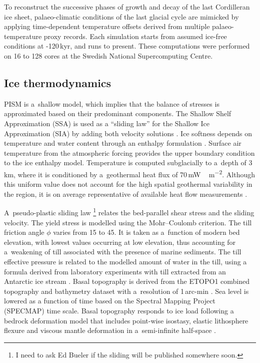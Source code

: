 \documentclass[tc, manuscript]{copernicus}
\begin{document}
To reconstruct the successive phases of growth and decay of the last Cordilleran
ice sheet, palaeo-climatic conditions of the last glacial cycle are mimicked
by applying time-dependent temperature offsets derived from multiple
palaeo-temperature proxy records. Each simulation starts from assumed ice-free
conditions at -120\,kyr, and runs to present. These computations were
performed on 16 to 128 cores at the Swedish National Supercomputing Centre.

\subsection{Ice thermodynamics}

PISM is a~shallow model, which implies that the balance of stresses is
approximated based on their predominant components.
The Shallow Shelf Approximation (SSA) is used as a ``sliding law'' for the
Shallow Ice Approximation (SIA) by adding both velocity solutions
\citep[Eqn.~15]{Winkelmann.etal.2011}.
Ice softness depends on temperature and water content through an enthalpy
formulation \citep{Aschwanden.etal.2012}. Surface air
temperature from the atmospheric forcing provides the upper boundary condition
to the ice enthalpy model. Temperature is computed subglacially to a~depth of
3\,km, where it is conditioned by a~geothermal heat flux of
70\,\unit{mW\,m^{-2}}. Although this uniform value does not
account for the high spatial geothermal variability in the region, it is on
average representative of available heat flow measurements
\citep{Blackwell.Richards.2004}.

A~pseudo-plastic sliding law \citep{PISM-authors.2014}\footnote{I need to ask
    Ed Bueler if the sliding will be published somewhere soon.} relates the
bed-parallel shear stress and the sliding velocity. The yield stress is
modelled using the Mohr--Coulomb criterion. The till friction angle $\phi$
varies from 15 to 45{\degree}. It is taken as a~function of modern bed
elevation, with lowest values occurring at low elevation, thus accounting
for a~weakening of till associated with the presence of marine sediments.
The till effective pressure is related to the modelled amount of water in the
till, using a formula derived from laboratory experiments with till extracted
from an Antarctic ice stream \citep[Eqn.~2]{Tulaczyk.etal.2000}. Basal
topography is
derived from the ETOPO1 combined topography and bathymetry dataset with
a~resolution of 1\,arc-min \citep{Amante.Eakins.2009}. Sea level is lowered as
a function of time based on the Spectral Mapping Project (SPECMAP)
\citep[SPECMAP,][]{Imbrie.etal.1989} time scale.
Basal topography responds to ice load
following a bedrock deformation model that includes point-wise isostasy,
elastic lithosphere flexure and viscous mantle deformation in a~semi-infinite
half-space \citep{Lingle.Clark.1985,Bueler.etal.2007}.
\end{document}
